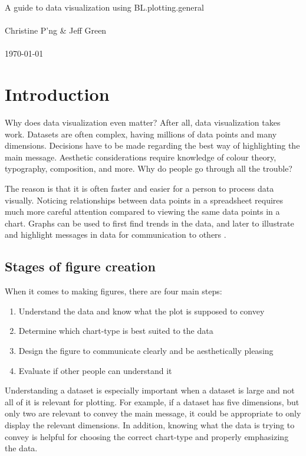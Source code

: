 \documentclass[letterpaper]{article}
\begin{document}
\begin{center}
	\LARGE{A guide to data visualization using BL.plotting.general}\\~\\
	\large{Christine P'ng \& Jeff Green}\\~\\
	\large{\today}
\end{center}
\tableofcontents

\newpage
\section{Introduction}
Why does data visualization even matter? After all, data visualization takes work. Datasets are often complex, having millions of data points and many dimensions. Decisions have to be made regarding the best way of highlighting the main message. Aesthetic considerations require knowledge of colour theory, typography, composition, and more. Why do people go through all the trouble?

The reason is that it is often faster and easier for a person to process data visually. Noticing relationships between data points in a spreadsheet requires much more careful attention compared to viewing the same data points in a chart. Graphs can be used to first find trends in the data, and later to illustrate and highlight messages in data for communication to others \cite{Anscombe}\cite{wong-dataexploration}.

\subsection{Stages of figure creation}
When it comes to making figures, there are four main steps:
\begin{enumerate}
\item Understand the data and know what the plot is supposed to convey
\item Determine which chart-type is best suited to the data
\item Design the figure to communicate clearly and be aesthetically pleasing
\item Evaluate if other people can understand it
\end{enumerate}

Understanding a dataset is especially important when a dataset is large and not all of it is relevant for plotting. For example, if a dataset has five dimensions, but only two are relevant to convey the main message, it could be appropriate to only display the relevant dimensions. In addition, knowing what the data is trying to convey is helpful for choosing the correct chart-type and properly emphasizing the data. 
\end{document}
